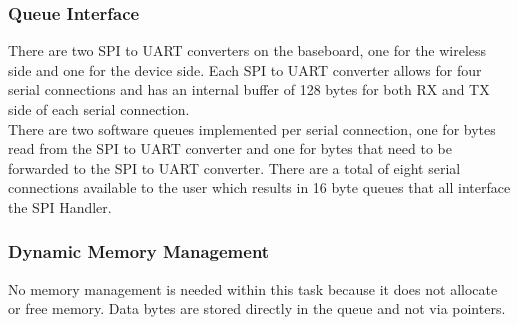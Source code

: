 \subsubsection{Queue Interface}
There are two SPI to UART converters on the baseboard, one for the wireless side and one for the device side. Each SPI to UART converter allows for four serial connections and has an internal buffer of 128 bytes for both RX and TX side of each serial connection.\\
There are two software queues implemented per serial connection, one for bytes read from the SPI to UART converter and one for bytes that need to be forwarded to the SPI to UART converter. There are a total of eight serial connections available to the user which results in 16 byte queues that all interface the SPI Handler.
\subsubsection{Dynamic Memory Management}
No memory management is needed within this task because it does not allocate or free memory. Data bytes are stored directly in the queue and not via pointers.
